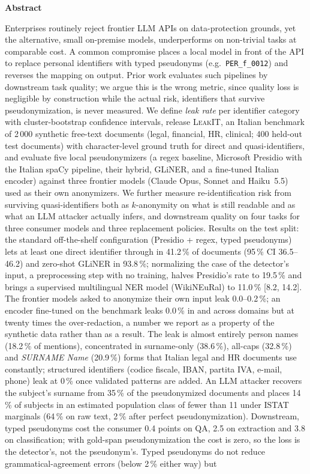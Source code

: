 \documentclass[11pt,a4paper]{article}
\newcommand{\pseud}[1]{\texttt{#1}}
\begin{document}
\vspace{1.1em}
\begin{abstractbox}
{\sffamily\bfseries\color{aigen}Abstract}\par\vspace{0.35em}
Enterprises routinely reject frontier LLM APIs on data-protection grounds, yet the alternative, small on-premise models, underperforms on non-trivial tasks at comparable cost. A common compromise places a local model in front of the API to replace personal identifiers with typed pseudonyms (e.g.\ \pseud{PER\_f\_0012}) and reverses the mapping on output. Prior work evaluates such pipelines by downstream task quality; we argue this is the wrong metric, since quality loss is negligible by construction while the actual risk, identifiers that survive pseudonymization, is never measured. We define \emph{leak rate} per identifier category with cluster-bootstrap confidence intervals, release \textsc{LeakIT}, an Italian benchmark of 2\,000 synthetic free-text documents (legal, financial, HR, clinical; 400 held-out test documents) with character-level ground truth for direct and quasi-identifiers, and evaluate five local pseudonymizers (a regex baseline, Microsoft Presidio with the Italian spaCy pipeline, their hybrid, GLiNER, and a fine-tuned Italian encoder) against three frontier models (Claude Opus, Sonnet and Haiku~5.5) used as their own anonymizers. We further measure re-identification risk from surviving quasi-identifiers both as $k$-anonymity on what is still readable and as what an LLM attacker actually infers, and downstream quality on four tasks for three consumer models and three replacement policies. Results on the test split: the standard off-the-shelf configuration (Presidio + regex, typed pseudonyms) lets at least one direct identifier through in 41.2\,\% of documents (95\,\% CI 36.5--46.2) and zero-shot GLiNER in 93.8\,\%; normalizing the case of the detector's input, a preprocessing step with no training, halves Presidio's rate to 19.5\,\% and brings a supervised multilingual NER model (WikiNEuRal) to 11.0\,\% [8.2, 14.2]. The frontier models asked to anonymize their own input leak 0.0--0.2\,\%; an encoder fine-tuned on the benchmark leaks 0.0\,\% in and across domains but at twenty times the over-redaction, a number we report as a property of the synthetic data rather than as a result. The leak is almost entirely person names (18.2\,\% of mentions), concentrated in surname-only (38.6\,\%), all-caps (32.8\,\%) and \emph{SURNAME Name} (20.9\,\%) forms that Italian legal and HR documents use constantly; structured identifiers (codice fiscale, IBAN, partita IVA, e-mail, phone) leak at 0\,\% once validated patterns are added. An LLM attacker recovers the subject's surname from 35\,\% of the pseudonymized documents and places 14\,\% of subjects in an estimated population class of fewer than 11 under ISTAT marginals (64\,\% on raw text, 2\,\% after perfect pseudonymization). Downstream, typed pseudonyms cost the consumer 0.4 points on QA, 2.5 on extraction and 3.8 on classification; with gold-span pseudonymization the cost is zero, so the loss is the detector's, not the pseudonym's. Typed pseudonyms do not reduce grammatical-agreement errors (below 2\,\% either way) but 
\end{abstractbox}
\end{document}
